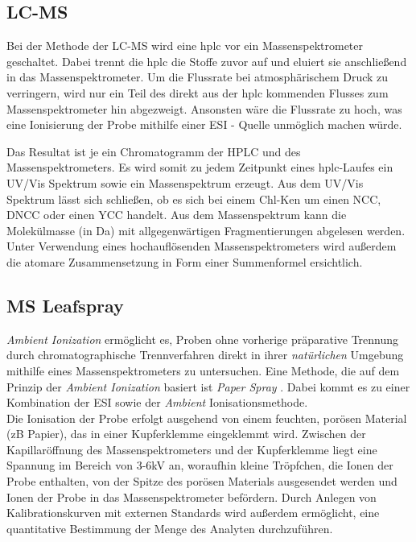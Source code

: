 \subsection{LC-MS}

Bei der Methode der LC-MS wird eine \gls{hplc} vor ein Massenspektrometer geschaltet. Dabei trennt die \gls{hplc} die Stoffe zuvor auf und eluiert sie anschließend in das Massenspektrometer. \cite[S. 217-218]{MassSpectrometry} Um die Flussrate bei atmosphärischem Druck zu verringern, wird nur ein Teil des direkt aus der \gls{hplc} kommenden Flusses zum Massenspektrometer hin abgezweigt. Ansonsten wäre die Flussrate zu hoch, was eine Ionisierung der Probe mithilfe einer \gls{ESI} - Quelle unmöglich machen würde. \cite[S. 221]{MassSpectrometry} 

Das Resultat ist je ein Chromatogramm der HPLC und des Massenspektrometers. Es wird somit zu jedem Zeitpunkt eines \gls{hplc}-Laufes ein UV/Vis Spektrum sowie ein Massenspektrum erzeugt. Aus dem UV/Vis Spektrum lässt sich schließen, ob es sich bei einem \gls{Chl-K}en um einen \gls{NCC}, \gls{DNCC} oder einen \gls{YCC} handelt. Aus dem Massenspektrum kann die Molekülmasse (in Da) mit allgegenwärtigen Fragmentierungen abgelesen werden. Unter Verwendung eines hochauflösenden Massenspektrometers wird außerdem die atomare Zusammensetzung in Form einer Summenformel ersichtlich. \\

\subsection{MS Leafspray} \label{sec:MSLeafspray}

\textit{Ambient Ionization} \cite{AmbientIonisation} ermöglicht es, Proben ohne vorherige präparative Trennung durch chromatographische Trennverfahren direkt in ihrer \textit{natürlichen} Umgebung mithilfe eines Massenspektrometers zu untersuchen. Eine Methode, die auf dem Prinzip der \textit{Ambient Ionization} basiert ist \textit{Paper Spray} \cite{PaperSpray}. Dabei  kommt es zu einer Kombination der \gls{ESI} sowie der \textit{Ambient} Ionisationsmethode. \cite{PaperSpray}\\

Die Ionisation der Probe erfolgt ausgehend von einem feuchten, porösen Material (\gls{zB} Papier), das in einer Kupferklemme eingeklemmt wird. Zwischen der Kapillaröffnung des Massenspektrometers und der Kupferklemme liegt eine Spannung im Bereich von 3-6kV an, woraufhin kleine Tröpfchen, die Ionen der Probe enthalten, von der Spitze des porösen Materials ausgesendet werden und Ionen der Probe in das Massenspektrometer befördern. \cite{RapidScreeningLeafSpray} Durch Anlegen von Kalibrationskurven mit externen Standards wird außerdem ermöglicht, eine quantitative Bestimmung der Menge des Analyten durchzuführen. \cite{LeafSpray}

